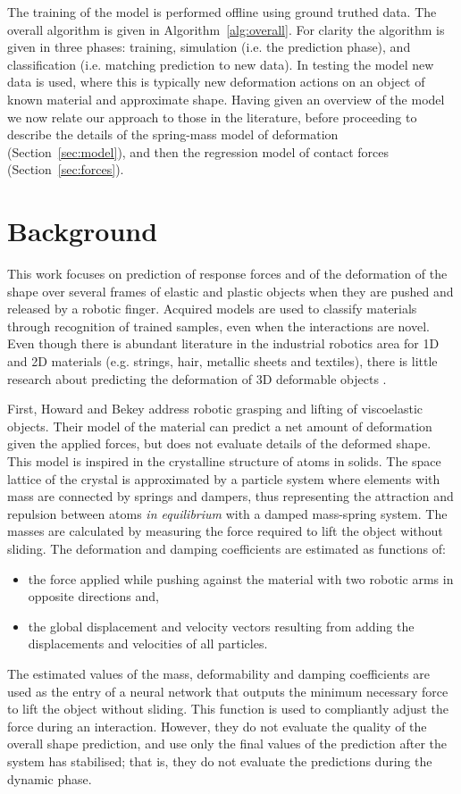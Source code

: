 \documentclass[journal]{IEEEtran}
\newcommand{\alref}[1]{Algorithm~\ref{#1}}
\newcounter{algorithm}
\begin{document}
The training of the model is performed offline using ground truthed data. The overall algorithm is given in \alref{alg:overall}. For clarity the algorithm is given in three phases: training, simulation (i.e. the prediction phase), and classification (i.e. matching prediction to new data). In testing the model new data is used, where this is typically new deformation actions on an object of known material and approximate shape. Having given an overview of the model we now relate our approach to those in the literature, before proceeding to describe the details of the spring-mass model of deformation (Section~\ref{sec:model}), and then the regression model of contact forces (Section~\ref{sec:forces}).

\section{Background}
\label{sec:background}
This work focuses on prediction of response forces and of the deformation of the shape over several frames of elastic and plastic objects when they are pushed and released by a robotic finger.  Acquired models are used to classify materials through recognition of trained samples, even when the interactions are novel.  Even though there is abundant literature in the industrial robotics area for 1D and 2D materials (e.g. strings, hair, metallic sheets and textiles), there is little research about predicting the deformation of 3D deformable objects \cite{Khalil2010review}.

First, Howard and Bekey \cite{Howard2000} address robotic grasping and lifting of viscoelastic objects.  Their model of the material can predict a net amount of deformation given the applied forces, but does not evaluate details of the deformed shape.   This model is inspired in the crystalline structure of atoms in solids.  The space lattice of the crystal is approximated by a particle system where elements with mass are connected by springs and dampers, thus representing the attraction and repulsion between atoms \emph{in equilibrium} with a damped mass-spring system.  The masses are calculated by measuring the force required to lift the object without sliding.  The deformation and damping coefficients are estimated as functions of:
\begin{itemize}
 \item the force applied while pushing against the material with two robotic arms in opposite directions and,
 \item the global displacement and velocity vectors resulting from adding the displacements and velocities of all particles.
\end{itemize}
The estimated values of the mass, deformability and damping coefficients are used as the entry of a neural network that outputs the minimum necessary force to lift the object without sliding.  This function is used to compliantly adjust the force during an interaction.  However, they do not evaluate the quality of the overall shape prediction, and use only the final values of the prediction after the system has stabilised; that is, they do not evaluate the predictions during the dynamic phase.
\end{document}
